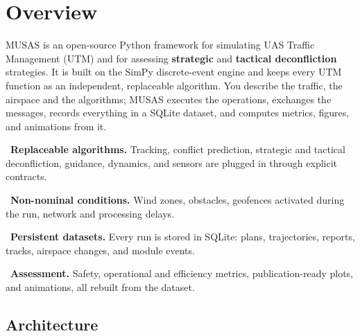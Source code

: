 \documentclass[11pt,a4paper,oneside]{report}
\begin{document}
\tableofcontents
\clearpage
{}

\chapter{Overview}

MUSAS is an open-source Python framework for simulating UAS Traffic
Management (UTM) and for assessing \textbf{strategic} and \textbf{tactical
deconfliction} strategies. It is built on the SimPy discrete-event engine and
keeps every UTM function as an independent, replaceable algorithm. You
describe the traffic, the airspace and the algorithms; MUSAS executes the
operations, exchanges the messages, records everything in a SQLite dataset,
and computes metrics, figures, and animations from it.

\begin{tcbraster}[raster columns=2, raster equal height, raster column skip=8pt,
  raster row skip=8pt, enhanced, colback=primarylight, colframe=primarylight,
  arc=3pt, boxrule=0pt, left=8pt, right=8pt, top=6pt, bottom=6pt]
\begin{tcolorbox}
  {\color{accent}\faPuzzlePiece}\ \textbf{Replaceable algorithms.} Tracking,
  conflict prediction, strategic and tactical deconfliction, guidance,
  dynamics, and sensors are plugged in through explicit contracts.
\end{tcolorbox}
\begin{tcolorbox}
  {\color{accent}\faWind}\ \textbf{Non-nominal conditions.} Wind zones,
  obstacles, geofences activated during the run, network and processing
  delays.
\end{tcolorbox}
\begin{tcolorbox}
  {\color{accent}\faDatabase}\ \textbf{Persistent datasets.} Every run is
  stored in SQLite: plans, trajectories, reports, tracks, airspace changes,
  and module events.
\end{tcolorbox}
\begin{tcolorbox}
  {\color{accent}\faChartLine}\ \textbf{Assessment.} Safety, operational and
  efficiency metrics, publication-ready plots, and animations, all rebuilt
  from the dataset.
\end{tcolorbox}
\end{tcbraster}

\section{Architecture}
\end{document}
